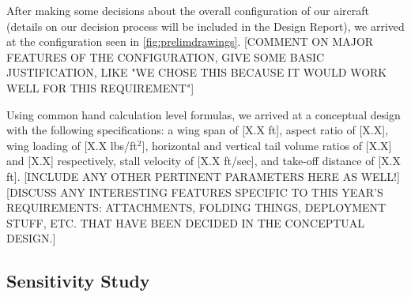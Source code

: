 
After making some decisions about the overall configuration of our aircraft (details on our decision process will be included in the Design Report), we arrived at the configuration seen in \cref{fig:prelimdrawings}.
{\color{BYUred}[COMMENT ON MAJOR FEATURES OF THE CONFIGURATION, GIVE SOME BASIC JUSTIFICATION, LIKE "WE CHOSE THIS BECAUSE IT WOULD WORK WELL FOR THIS REQUIREMENT"]}

Using common hand calculation level formulas, we arrived at a conceptual design with the following specifications: a wing span of {\color{BYUred} [X.X ft]}, aspect ratio of {\color{BYUred} [X.X]}, wing loading of {\color{BYUred} [X.X lbs/ft$^2$]}, horizontal and vertical tail volume ratios of {\color{BYUred} [X.X]} and {\color{BYUred} [X.X]} respectively, stall velocity of {\color{BYUred} [X.X ft/sec]}, and take-off distance of {\color{BYUred} [X.X ft]}.  {\color{BYUred}[INCLUDE ANY OTHER PERTINENT PARAMETERS HERE AS WELL!]}
{\color{BYUred}[DISCUSS ANY INTERESTING FEATURES SPECIFIC TO THIS YEAR'S REQUIREMENTS: ATTACHMENTS, FOLDING THINGS, DEPLOYMENT STUFF, ETC. THAT HAVE BEEN DECIDED IN THE CONCEPTUAL DESIGN.]}
\lipsum[1]

\subsection{Sensitivity Study}
\label{ssec:SensitivityStudy}


